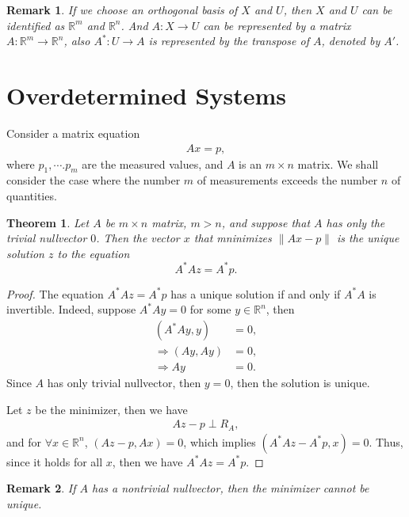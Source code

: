 \documentclass[10pt]{book}
\newtheorem{theorem}{Theorem}[chapter]
\newtheorem{remark}{Remark}[chapter]
\theoremstyle{definition}
\numberwithin{equation}{chapter}
\begin{document}
\begin{remark}
If we choose an orthogonal basis of $X$ and $U$, then $X$ and $U$ can be identified as $\mathbb{R}^m$ and $\mathbb{R}^n$. And $A:X\to U$ can be represented by a matrix $A:\mathbb{R}^m\to \mathbb{R}^n$, also $A^*:U\to A$ is represented by the transpose of $A$, denoted by $A'$.
\end{remark}

\section{Overdetermined Systems}

Consider a matrix equation
\begin{align*}
    Ax = p,
\end{align*}
where $p_1,\cdots.p_m$ are the measured values, and $A$ is an $m\times n$ matrix. We shall
consider the case where the number $m$ of measurements exceeds the number $n$ of quantities. 

\medskip

\begin{theorem}
Let $A$ be $m\times n$ matrix, $m > n$, and suppose that $A$ has only the trivial nullvector $0$. Then the vector $x$ that mninimizes $\|Ax - p\|$ is the unique solution $z$ to the equation
$$A^* A z = A^* p.$$
\end{theorem}
\begin{proof}
The equation $A^* A z = A^* p$ has a unique solution if and only if $A^* A$ is invertible. Indeed, suppose $A^* Ay = 0$ for some $y \in \mathbb{R}^n$, then 
\begin{align*}
    (A^* A y, y) & = 0, \\
    \Rightarrow (Ay, Ay) & = 0, \\
    \Rightarrow Ay & = 0.
\end{align*}
Since $A$ has only trivial nullvector, then $y = 0$, then the solution is unique.

Let $z$ be the minimizer, then we have
\begin{align*}
    Az - p \perp R_A,
\end{align*}
and for $\forall x\in\mathbb{R}^n$, $(Az - p, Ax) = 0$, which implies $(A^*Az - A^*p, x) = 0$. Thus, since it holds for all $x$, then we have $A^*Az = A^*p$.
\end{proof}

\begin{remark}
If $A$ has a nontrivial nullvector, then the minimizer cannot be unique.
\end{remark}
\end{document}
